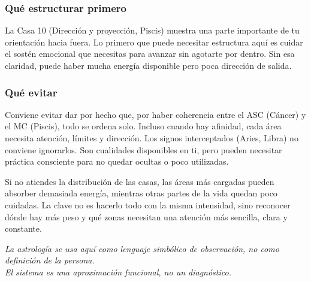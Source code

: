 \documentclass[11pt,a4paper]{article}
\begin{document}
\subsubsection*{Qué estructurar primero}
La Casa 10 (Dirección y proyección, Piscis) muestra una parte importante de tu orientación hacia fuera. Lo primero que puede necesitar estructura aquí es cuidar el sostén emocional que necesitas para avanzar sin agotarte por dentro. Sin esa claridad, puede haber mucha energía disponible pero poca dirección de salida.

\subsubsection*{Qué evitar}
Conviene evitar dar por hecho que, por haber coherencia entre el ASC (Cáncer) y el MC (Piscis), todo se ordena solo. Incluso cuando hay afinidad, cada área necesita atención, límites y dirección. Los signos interceptados (Aries, Libra) no conviene ignorarlos. Son cualidades disponibles en ti, pero pueden necesitar práctica consciente para no quedar ocultas o poco utilizadas.

\vspace{0.6cm}
Si no atiendes la distribución de las casas, las áreas más cargadas pueden absorber demasiada energía, mientras otras partes de la vida quedan poco cuidadas. La clave no es hacerlo todo con la misma intensidad, sino reconocer dónde hay más peso y qué zonas necesitan una atención más sencilla, clara y constante.

\vspace{0.5cm}
\begin{center}
{\small\itshape\color{grisai}
La astrología se usa aquí como lenguaje simbólico de observación, no como definición de la persona.\\
El sistema es una aproximación funcional, no un diagnóstico.
}
\end{center}
\end{document}
